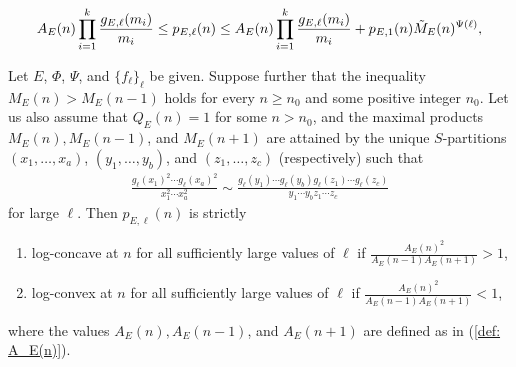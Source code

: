 \documentclass[10pt,a4paper]{amsart}
\begin{document}
\begin{align}\label{def: A_E(n)}
A_E(n)\prod_{i=1}^k\frac{g_{E,\ell }(m_i)}{m_i}\leq p_{E,\ell }(n) \leq A_E(n)\prod_{i=1}^k\frac{g_{E,\ell }(m_i)}{m_i}+p_{E,1}(n)\Tilde{M}_E(n)^{\Psi(\ell)},
\end{align}

\begin{theorem}\label{thm: involved}
Let $E$, $\Phi$, $\Psi$, and
$\{f_{\ell}\}_{\ell}$ be given. Suppose further that the inequality
$M_E(n)>M_E(n-1)$ holds for every $n\geq n_0$ and some positive integer
$n_0$. Let us also assume that $Q_{E}\left( n\right) =1$ for some
$n>n_0$, and  the maximal products $M_E(n), M_E(n-1)$,
and $M_E(n+1)$ are attained by the unique $S$-partitions $(x_1,\ldots,x_a)$,
$(y_1,\ldots,y_b)$, and $(z_1,\ldots,z_c)$ (respectively) such that
\begin{align*}
\frac{g_{\ell}(x_1)^2\cdots g_{\ell}(x_a)^2}{x_1^2\cdots x_a^2}\sim
\frac{g_{\ell}(y_1)\cdots g_{\ell}(y_b)g_{\ell}(z_1)\cdots g_{\ell}(z_c)}{y_1\cdots y_bz_1\cdots z_c}
\end{align*}
for large $\ell $.
Then $p_{E,\ell }(n)$ is strictly
\begin{enumerate}
\item  log-concave at $n$ for all sufficiently large values of $\ell$ if $\frac{A_E(n)^2}{A_E(n-1)A_E(n+1)}>1$,
\item  log-convex at $n$ for all sufficiently large values of $\ell$ if $\frac{A_E(n)^2}{A_E(n-1)A_E(n+1)}<1$,
\end{enumerate}
where the values $A_E(n), A_E(n-1)$, and $A_E(n+1)$ are defined as in  (\ref{def: A_E(n)}).
\end{theorem}
\end{document}
